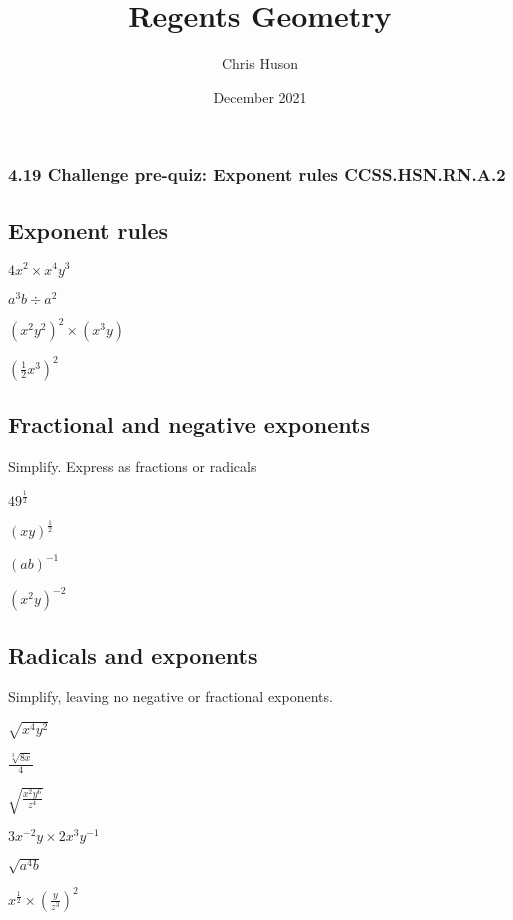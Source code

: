 \documentclass[12pt, twoside]{article}
\title{Regents Geometry}
\author{Chris Huson}
\date{December 2021}
\begin{document}
\subsubsection*{4.19 Challenge pre-quiz: Exponent rules \hfill CCSS.HSN.RN.A.2}
\begin{enumerate}[itemsep=1.7cm]
\subsection*{Exponent rules}  
  \begin{multicols}{2}
    \item $\displaystyle 4x^{2} \times x^4 y^3$
    \item $a^3 b \div a^{2}$
    \item $(x^2 y^2)^2 \times (x^3 y)$
    \item $\displaystyle (\frac{1}{2} x^3)^2$
  \end{multicols} \vspace{1cm}

\subsection*{Fractional and negative exponents}
Simplify. Express as fractions or radicals
  \begin{multicols}{2}  
    \item $\displaystyle  49^\frac{1}{2}$
    \item $\displaystyle  (xy)^\frac{1}{2}$
    \item $\displaystyle  (ab)^{-1}$
    \item $\displaystyle  (x^2 y)^{-2}$
  \end{multicols} \vspace{1cm}

\subsection*{Radicals and exponents}
Simplify, leaving no negative or fractional exponents.
  \begin{multicols}{2}  
    \item $\sqrt{x^4 y^2}$
    \item $\displaystyle  \frac{\sqrt[3]{8x}}{4}$
    \item $\displaystyle  \sqrt{\frac{x^2 y^{6}}{z^{4}}}$
    \item $3x^{-2}y \times 2x^3y^{-1}$
    \item $\sqrt{a^4b}$
    \item $\displaystyle x^{\frac{1}{2}} \times (\frac{y}{z^3})^2$
    \end{multicols}


\end{enumerate}
\end{document}
